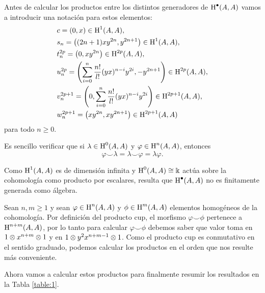 \documentclass[fleqn,../tesis.tex]{subfiles}
\begin{document}
Antes de calcular los productos entre los distintos generadores
de $\operatorname{H}^{\bullet}(A, A)$ vamos a introducir una notación para estos elementos:
\begin{align*}
	&c = \left(0,x\right) \in \operatorname{H}^1(A, A),\\
	&s_n = \left((2n + 1)xy^{2n}, y^{2n + 1}\right)\in \operatorname{H}^1(A, A),\\
	&t_n^{2p} = \left(0, xy^{2n}\right) \in 	\operatorname{H}^{2p}(A, A),\\
	&u_n^{2p} = \left(\sum_{i = 0}^{n}\frac{n!}{l!}(yx)^{n - i}y^{2i}, -y^{2n + 1}\right)
		\in 	\operatorname{H}^{2p}(A, A),\\
	&v_n^{2p + 1} = \left(0, \sum_{i = 0}^{n}\frac{n!}{l!}(yx)^{n - i}y^{2i}\right)
		\in 	\operatorname{H}^{2p + 1}(A, A),\\
	&w_n^{2p + 1} = \left(xy^{2n}, xy^{2n + 1}\right)
		\in 	\operatorname{H}^{2p + 1}(A, A)
\end{align*}
para todo $n \geq 0$. 

Es sencillo verificar que si $\lambda \in \operatorname{H}^{0}(A, A)$ y $\varphi \in \operatorname{H}^{n}(A, A)$,
entonces
\[
	\varphi \smile \lambda = \lambda \smile \varphi = \lambda \varphi.
\]
\begin{obs}
Como $\operatorname{H}^1(A,A)$ es de dimensión infinita y $\operatorname{H}^{0}(A, A) \cong \Bbbk$ actúa sobre la cohomología
como producto por escalares, resulta que $\operatorname{H}^{\bullet}(A, A)$ no es finitamente generada como
álgebra.
\end{obs}

Sean $n, m \geq 1$
y sean $\varphi \in \operatorname{H}^{n}(A, A)$ y $\phi \in \operatorname{H}^{m}(A, A)$ elementos homogéneos de la cohomología.
Por definición del producto cup, el morfismo $\varphi \smile \phi$ pertenece a $\operatorname{H}^{n + m}(A, A)$,
por lo tanto para calcular $\varphi \smile \phi$ debemos saber que valor toma en $1\otimes x^{n + m} \otimes 1$
y en $1\otimes y^{2}x^{n + m -1}\otimes 1$. Como el producto cup es conmutativo en el sentido graduado, podemos
calcular los productos en el orden que nos resulte más conveniente.

Ahora vamos a calcular estos productos para finalmente resumir los resultados en la Tabla \ref{table:1}.
\end{document}
